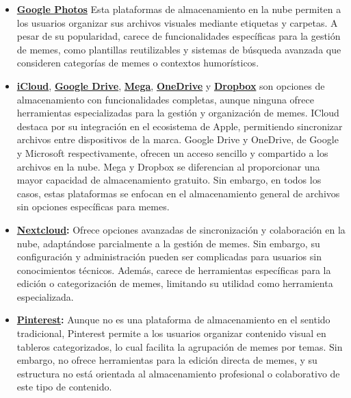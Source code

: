 \begin{itemize}
  \item \textbf{\href{https://www.google.com/intl/es_es/photos/about/}{Google Photos}} Esta plataformas de almacenamiento en la nube permiten a los usuarios organizar sus archivos visuales mediante etiquetas y carpetas. A pesar de su popularidad, carece de funcionalidades específicas para la gestión de memes, como plantillas reutilizables y sistemas de búsqueda avanzada que consideren categorías de memes o contextos humorísticos.
  \item \textbf{\href{https://www.icloud.com/}{iCloud}}, \textbf{\href{https://drive.google.com/drive/my-drive?hl=es-419}{Google Drive}}, \textbf{\href{https://mega.io/es}{Mega}}, \textbf{\href{https://www.microsoft.com/es-es/microsoft-365/onedrive/online-cloud-storage}{OneDrive}} y \textbf{\href{https://www.dropbox.com/}{Dropbox}} son opciones de almacenamiento con funcionalidades completas, aunque ninguna ofrece herramientas especializadas para la gestión y organización de memes. ICloud destaca por su integración en el ecosistema de Apple, permitiendo sincronizar archivos entre dispositivos de la marca. Google Drive y OneDrive, de Google y Microsoft respectivamente, ofrecen un acceso sencillo y compartido a los archivos en la nube. Mega y Dropbox se diferencian al proporcionar una mayor capacidad de almacenamiento gratuito. Sin embargo, en todos los casos, estas plataformas se enfocan en el almacenamiento general de archivos sin opciones específicas para memes.
  \item \textbf{\href{https://nextcloud.com/es/}{Nextcloud}:} Ofrece opciones avanzadas de sincronización y colaboración en la nube, adaptándose parcialmente a la gestión de memes. Sin embargo, su configuración y administración pueden ser complicadas para usuarios sin conocimientos técnicos. Además, carece de herramientas específicas para la edición o categorización de memes, limitando su utilidad como herramienta especializada.
  \item \textbf{\href{https://es.pinterest.com/}{Pinterest}:} Aunque no es una plataforma de almacenamiento en el sentido tradicional, Pinterest permite a los usuarios organizar contenido visual en tableros categorizados, lo cual facilita la agrupación de memes por temas. Sin embargo, no ofrece herramientas para la edición directa de memes, y su estructura no está orientada al almacenamiento profesional o colaborativo de este tipo de contenido.
\end{itemize}

